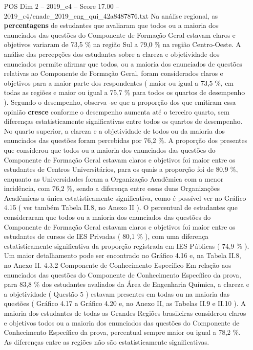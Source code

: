 \begin{textsample}{POS Dim 2 – 2019\_c4 – Score 17.00 – 2019\_c4/enade\_2019\_eng\_qui\_42a8487876.txt}
Na análise regional, as \textbf{percentagens} de estudantes que avaliaram que todos ou a maioria dos enunciados das questões do Componente de Formação Geral estavam claros e objetivos variaram de 73,5 \% na região Sul a 79,0 \% na região Centro-Oeste.
A análise das percepções dos estudantes sobre a clareza e objetividade dos enunciados permite afirmar que todos, ou a maioria dos enunciados de questões relativas ao Componente de Formação Geral, foram considerados claros e objetivos para a maior parte dos respondentes ( maior ou igual a 73,5 \%, em todas as regiões e maior ou igual a 75,7 \% para todos os quartos de desempenho ).
Segundo o desempenho, observa -se que a proporção dos que emitiram essa opinião \textbf{cresce} conforme o desempenho aumenta até o terceiro quarto, sem diferenças estatisticamente significativas entre todos os quartos de desempenho.
No quarto superior, a clareza e a objetividade de todos ou da maioria dos enunciados das questões foram percebidas por 76,2 \%.
A proporção dos presentes que considerou que todos ou a maioria dos enunciados das questões do Componente de Formação Geral estavam claros e objetivos foi maior entre os estudantes de Centros Universitários, para os quais a proporção foi de 80,9 \%, enquanto as Universidades foram a Organização Acadêmica com a menor incidência, com 76,2 \%, sendo a diferença entre essas duas Organizações Acadêmicas a única estatisticamente significativa, como é possível ver no Gráfico 4.15 ( ver também Tabela II.8, no Anexo II ).
O percentual de estudantes que consideraram que todos ou a maioria dos enunciados das questões do Componente de Formação Geral estavam claros e objetivos foi maior entre os estudantes de cursos de IES Privadas ( 80,1 \% ), com uma diferença estatisticamente significativa da proporção registrada em IES Públicas ( 74,9 \% ).
Um maior detalhamento pode ser encontrado no Gráfico 4.16 e, na Tabela II.8, no Anexo II. 4.3.2 Componente de Conhecimento Específico Em relação aos enunciados das questões do Componente de Conhecimento Específico da prova, para 83,8 \% dos estudantes avaliados da Área de Engenharia Química, a clareza e a objetividade ( Questão 5 ) estavam presentes em todas ou na maioria das questões ( Gráfico 4.17 a Gráfico 4.20 e, no Anexo II, as Tabelas II.9 e II.10 ).
A maioria dos estudantes de todas as Grandes Regiões brasileiras considerou claros e objetivos todos ou a maioria dos enunciados das questões do Componente de Conhecimento Específico da prova, percentual sempre maior ou igual a 78,2 \%.
As diferenças entre as regiões não são estatisticamente significativas.

\end{textsample}

